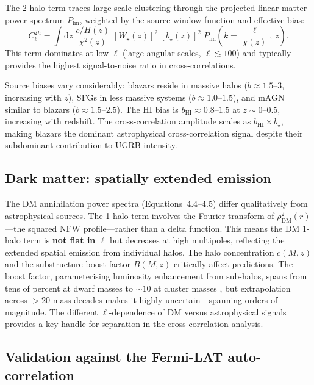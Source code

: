 \documentclass[10pt,a4paper]{article}
\begin{document}
The 2-halo term traces large-scale clustering through the projected linear matter power spectrum $P_{\mathrm{lin}}$, weighted by the source window function and effective bias:
\begin{equation}
\label{eq:C2h}
    C_\ell^{2h} = \int \mathrm{d}z\;\frac{c/H(z)}{\chi^2(z)}\;\left[W_\star(z)\right]^2\;\left[b_\star(z)\right]^2\;P_{\mathrm{lin}}\!\left(k = \frac{\ell}{\chi(z)},\,z\right).
\end{equation}
This term dominates at low $\ell$ (large angular scales, $\ell \lesssim 100$) and typically provides the highest signal-to-noise ratio in cross-correlations.

Source biases vary considerably: blazars reside in massive halos ($b \approx 1.5$--$3$, increasing with $z$), SFGs in less massive systems ($b \approx 1.0$--$1.5$), and mAGN similar to blazars ($b \approx 1.5$--$2.5$). The HI bias is $b_{\mathrm{HI}} \approx 0.8$--$1.5$ at $z \sim 0$--$0.5$, increasing with redshift. The cross-correlation amplitude scales as $b_{\mathrm{HI}} \times b_\star$, making blazars the dominant astrophysical cross-correlation signal despite their subdominant contribution to UGRB intensity.

\subsection{Dark matter: spatially extended emission}

The DM annihilation power spectra (Equations~4.4--4.5) differ qualitatively from astrophysical sources. The 1-halo term involves the Fourier transform of $\rho^2_{\mathrm{DM}}(r)$---the squared NFW profile---rather than a delta function. This means the DM 1-halo term is \textbf{not flat in $\ell$} but decreases at high multipoles, reflecting the extended spatial emission from individual halos. The halo concentration $c(M,z)$ and the substructure boost factor $B(M,z)$ critically affect predictions. The boost factor, parameterising luminosity enhancement from sub-halos, spans from tens of percent at dwarf masses to $\sim10$ at cluster masses \citep{Hiroshima2018}, but extrapolation across $>20$ mass decades makes it highly uncertain---spanning orders of magnitude. The different $\ell$-dependence of DM versus astrophysical signals provides a key handle for separation in the cross-correlation analysis.

\subsection{Validation against the Fermi-LAT auto-correlation}
\end{document}
